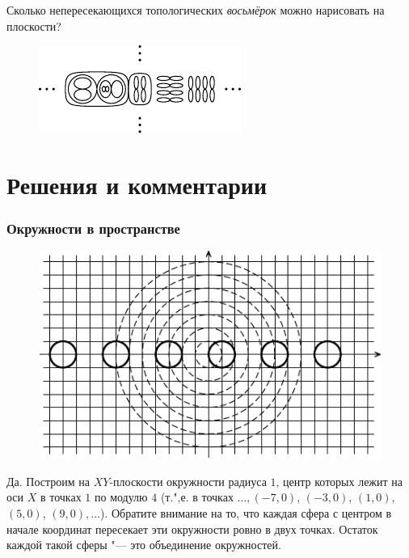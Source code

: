 \documentclass[twoside]{book}
\begin{document}
Сколько непересекающихся топологических \emph{восьмёрок} можно нарисовать на плоскости?

\begin{figure}[!ht]
  \centering
  \vspace{-.5\baselineskip}
\includegraphics{mp/wink-9}

  \vspace{-.5\baselineskip}

\end{figure} 


\section*{Решения и комментарии}

\subsubsection*{Окружности в пространстве}%

\begin{figure}[b]
  \vspace{-\jot}
\centering
\includegraphics {mp/wink-10}
\end{figure} 

Да.
Построим на $XY$-плоскости окружности радиуса $1$, центр которых лежит на оси $X$ в точках $1$ по модулю $4$ (т.",е. в точках $\dots, (-7,0)$, $(-3,0)$, $(1,0)$, $(5,0)$, $(9,0),\dots$).
Обратите внимание на то, что каждая сфера с центром в начале координат пересекает эти окружности ровно в двух точках.
Остаток каждой такой сферы "--- это объединение окружностей.
\heart
\end{document}
